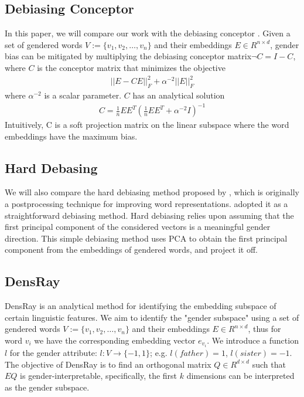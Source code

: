 \subsection{Debiasing Conceptor}
In this paper, we will compare our work with the debiasing conceptor \cite{karve2019conceptor}. Given a set of gendered words $V:=\{v_1,v_2,\dots,v_n\}$ and their embeddings $E \in R^{n\times d}$, gender bias can be mitigated by multiplying the debiasing conceptor matrix$\neg C= I-C$, where $C$ is the conceptor matrix that minimizes the objective
\begin{eqnarray}
||E-CE||^2_F+\alpha^{-2}||E||^2_F
\end{eqnarray}
where $\alpha^{-2}$ is a scalar parameter. $C$ has an analytical solution
\begin{eqnarray}
C=\frac{1}{n}EE^T(\frac{1}{n}EE^T+\alpha^{-2}I)^{-1}
\end{eqnarray}
Intuitively, C is a soft projection matrix on the linear subspace where the word embeddings have the maximum bias.
\subsection{Hard Debasing}
We will also compare the hard debiasing method proposed by \cite{mu2018all}, which is originally a postprocessing technique for improving word representations. \cite{karve2019conceptor} adopted it as a straightforward debiasing method. Hard debiasing relies upon assuming that the first principal component of the considered vectors is a meaningful gender direction. This simple debiasing method uses PCA to obtain the first principal component from the embeddings of gendered words, and project it off.

\subsection{DensRay}
DensRay is an analytical method for identifying the
embedding subspace of certain linguistic features. We aim to
identify the "gender subspace" using a set of gendered words
$V:=\{v_1,v_2,\dots,v_n\}$ and their embeddings $E \in
R^{n\times d}$, thus for word $v_i$ we have the
corresponding embedding vector $e_{v_i}$. We
introduce a function $l$ for the gender attribute:
$l:V\to \{-1,1\}$;
e.g. $l(father)=1$, $l(sister)=-1$. The objective of DensRay
is to find an orthogonal matrix $Q\in R^{d\times d}$ such
that $EQ$ is gender-interpretable, specifically, the first
$k$ dimensions can be interpreted as the gender subspace.

